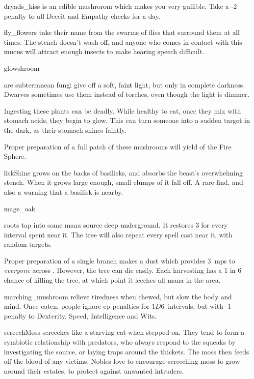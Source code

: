 \begin{multicols}{2}
%
  {dryads_kiss}%
  {is an edible mushrorom which makes you very gullible.
  Take a -2 penalty to all Deceit and Empathy checks for a day.}%

%
  {fly_flowers}%
  {take their name from the swarms of flies that surround them at all times.
  The stench doesn't wash off, and anyone who comes in contact with this mucus will attract enough insects to make hearing speech difficult.}%

%
  {glowshroom}%
  {are subterranean fungi give off a soft, faint light, but only in complete darkness.
   Dwarves sometimes use them instead of torches, even though the light is dimmer.

   Ingesting these plants can be deadly.
   While healthy to eat, once they mix with stomach acids, they begin to glow.
   This can turn someone into a sudden target in the dark, as their stomach shines faintly.

   Proper preparation of a full patch of these mushrooms will yield  of the Fire Sphere.
    }

%
  {liskShine}%
  {grows on the backs of basilisks, and absorbs the beast's overwhelming stench.
  When it grows large enough, small clumps of it fall off.
  A rare find, and also a warning that a basilisk is nearby.
    }

%
  {mage_oak}%
  {roots tap into some mana source deep underground.
    It restores 3  for every \gls{interval} spent near it.
    The tree will also repeat every spell cast near it, with random targets.

    Proper preparation of a single branch makes a dust which provides 3~\glspl{mp} to \emph{everyone} across .
    However, the tree can die easily.
    Each harvesting has a 1 in 6 chance of killing the tree, at which point it leeches all mana in the \gls{area}.
  }%


%
  {marching_mushroom}%
  {relieve tiredness when chewed, but slow the body and mind.
    Once eaten, people ignore \gls{ep} penalties for $1D6$~\glspl{interval}, but with -1 penalty to Dexterity, Speed, Intelligence and Wits.
    }

%
  {screechMoss}%
  {screeches like a starving cat when stepped on.
  They tend to form a symbiotic relationship with predators, who always respond to the squeaks by investigating the source, or laying traps around the thickets.
  The moss then feeds off the blood of any victims.
  Nobles love to encourage screeching moss to grow around their estates, to protect against unwanted intruders.
    }


\end{multicols}
